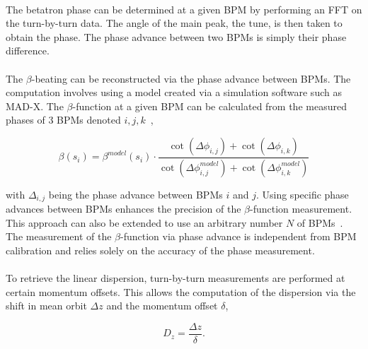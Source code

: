 \FloatBarrier

\paragraph{}
The betatron phase can be determined at a given BPM by performing an FFT on the turn-by-turn
data. The angle of the main peak, the tune, is then taken to obtain the phase. The phase advance
between two BPMs is simply their phase difference.


\paragraph{} 
The $\beta$-beating can be reconstructed via the phase advance between BPMs. The computation
involves using a model created via a simulation software such as MAD-X. The $\beta$-function at a
given BPM can be calculated from the measured phases of 3 BPMs denoted $i, j,
k$~\cite{minty_measurement_2003},

\begin{equation}
    \beta(s_i) = \beta^{model}(s_i) \cdot \frac{\cot(\Delta\phi_{i,j}) + \cot(\Delta\phi_{i,k})}{\cot\left(\Delta\phi_{i,j}^{model}\right) + \cot\left(\Delta\phi_{i, k}^{model}\right)}
\end{equation}

with $\Delta_{i,j}$ being the phase advance between BPMs $i$ and $j$. Using specific phase advances
between BPMs enhances the precision of the $\beta$-function measurement. This approach can also be
extended to use an arbitrary number $N$ of
BPMs~\cite{langner_utilizing_2016,wegscheider_analytical_2017}. The measurement of the
$\beta$-function via phase advance is independent from BPM calibration and relies solely on the
accuracy of the phase measurement.


\paragraph{} To retrieve the linear dispersion, turn-by-turn measurements are
performed at certain momentum offsets. This allows the computation of the dispersion via the shift
in mean orbit $\Delta z$ and the momentum offset $\delta$,

\begin{equation}
    D_z = \frac{\Delta z}{\delta}.
\end{equation}

